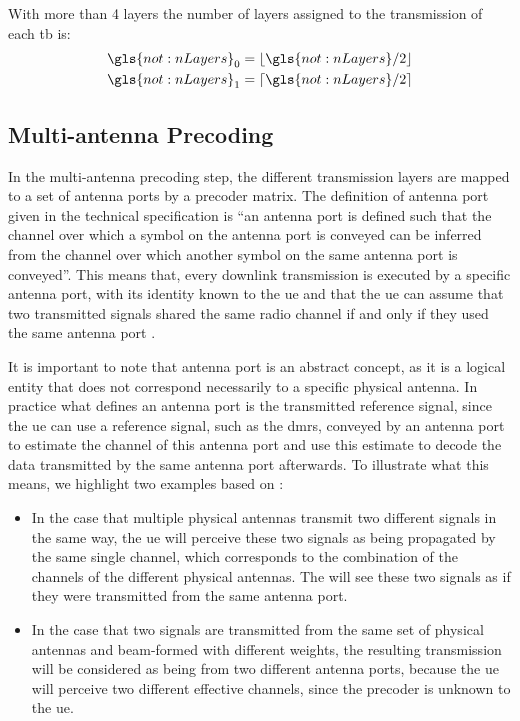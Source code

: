 %
With more than 4 layers the number of layers assigned to the transmission of each \gls{tb} is:
\begin{equation}
    \begin{gathered}
        \gls{not:nLayers}_0 = \floor{\gls{not:nLayers}/2} \\
        \gls{not:nLayers}_1 = \ceil{\gls{not:nLayers}/2}
    \end{gathered}
\end{equation}


\subsection{Multi-antenna Precoding}

In the multi-antenna precoding step, the different transmission layers are mapped to a set of antenna ports by a precoder matrix.
%
The definition of antenna port given in the technical specification \cite{3gpp.38.211} is ``an antenna port is defined such that the channel over which a symbol on the antenna port is conveyed can be inferred from the channel over which another symbol on the same antenna port is conveyed''\cite[Section 4.4.1]{3gpp.38.211}.
%
This means that, every downlink transmission is executed by a specific antenna port, with its identity known to the \gls{ue} and that the \gls{ue} can assume that two transmitted signals shared the same radio channel if and only if they used the same antenna port \cite{ErikDahlman5G, AliZaidi632018}.
%

It is important to note that antenna port is an abstract concept, as it is a logical entity that does not correspond necessarily to a specific physical antenna.
%
In practice what defines an antenna port is the transmitted reference signal, since the \gls{ue} can use a reference signal, such as the \gls{dmrs}, conveyed by an antenna port to estimate the channel of this antenna port and use this estimate to decode the data transmitted by the same antenna port afterwards.
%
To illustrate what this means, we highlight two examples based on \cite{ErikDahlman5G, AliZaidi632018}:
\begin{itemize}
    \item In the case that multiple physical antennas transmit two different signals in the same way, the \gls{ue} will perceive these two signals as being propagated by the same single channel, which corresponds to the combination of the channels of the different physical antennas. The \ue will see these two signals as if they were transmitted from the same antenna port.

    \item In the case that two signals are transmitted from the same set of physical antennas and beam-formed with different weights, the resulting transmission will be considered as being from two different antenna ports, because the \gls{ue} will perceive two different effective channels, since the precoder is unknown to the \gls{ue}.
\end{itemize}

